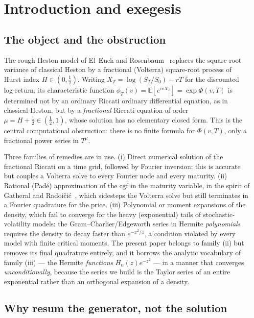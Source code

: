 \documentclass[11pt]{article}
\newcommand{\E}{\mathbb{E}}
\begin{document}
\tableofcontents

\section{Introduction and exegesis}\label{sec:intro}

\subsection{The object and the obstruction}

The rough Heston model of El~Euch and Rosenbaum~\cite{ElEuchRosenbaum}
replaces the square-root variance of classical Heston by a fractional
(Volterra) square-root process of Hurst index $H\in(0,\tfrac12)$. Writing
$X_T=\log(S_T/S_0)-rT$ for the discounted log-return, its characteristic
function $\phi_T(v)=\E[e^{ivX_T}]=\exp\Phi(v,T)$ is determined not by an
ordinary Riccati ordinary differential equation, as in classical Heston,
but by a \emph{fractional} Riccati equation of order $\mu=H+\tfrac12\in
(\tfrac12,1)$, whose solution has no elementary closed form. This is the
central computational obstruction: there is no finite formula for
$\Phi(v,T)$, only a fractional power series in $T^{\mu}$.

Three families of remedies are in use. (i) Direct numerical solution of the
fractional Riccati on a time grid, followed by Fourier inversion; this is
accurate but couples a Volterra solve to every Fourier node and every
maturity. (ii) Rational (Pad\'e) approximation of the cgf in the maturity
variable, in the spirit of Gatheral and Radoi\v{c}i\'c~\cite{GatheralRadoicic},
which sidesteps the Volterra solve but still terminates in a Fourier
quadrature for the price. (iii) Polynomial or moment expansions of the
density, which fail to converge for the heavy (exponential) tails of
stochastic-volatility models: the Gram--Charlier/Edgeworth series in Hermite
\emph{polynomials} requires the density to decay faster than $e^{-x^2/4}$,
a condition violated by every model with finite critical moments. The
present paper belongs to family (ii) but removes its final quadrature
entirely, and it borrows the analytic vocabulary of family (iii) --- the
Hermite \emph{functions} $H_{n}(z)e^{-z^2}$ --- in a manner that converges
\emph{unconditionally}, because the series we build is the Taylor series of
an entire exponential rather than an orthogonal expansion of a density.

\subsection{Why resum the generator, not the solution}
\end{document}
